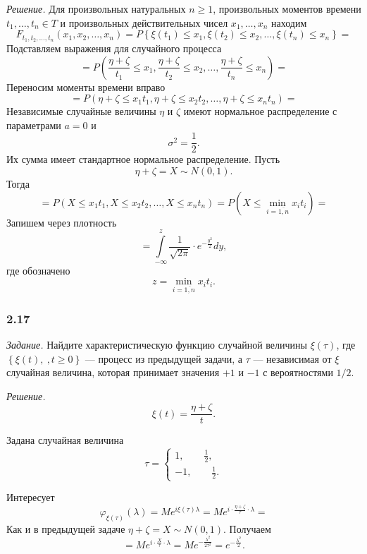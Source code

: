 \textit{Решение.}
Для произвольных натуральных $n \geq 1$,
произвольных моментов времени $t_1, \dotsc, t_n \in T$ и произвольных действительных чисел
$x_1, \dotsc, x_n$ находим
$$F_{t_1, t_2, \dotsc, t_n} \left( x_1, x_2, \dotsc, x_n \right) =
  P \left\{
    \xi \left( t_1 \right) \leq x_1, \xi \left( t_2 \right) \leq x_2, \dotsc,
    \xi \left( t_n \right) \leq x_n \right\} =$$
Подставляем выражения для случайного процесса
$$= P \left(
    \frac{ \eta + \zeta }{t_1} \leq x_1, \frac{ \eta + \zeta }{t_2} \leq x_2, \dotsc,
    \frac{ \eta + \zeta }{t_n} \leq x_n \right) =$$
Переносим моменты времени вправо
$$= P \left(
    \eta + \zeta \leq x_1 t_1, \eta + \zeta \leq x_2 t_2, \dotsc, \eta + \zeta \leq x_n t_n
  \right) =$$
Независимые случайные величины $ \eta $ и $ \zeta $ имеют нормальное распределение с параметрами
$a = 0$ и
$$ \sigma^2 =
  \frac{1}{2}.$$
Их сумма имеет стандартное нормальное распределение.
Пусть
$$ \eta + \zeta =
  X \sim
  N \left( 0, 1 \right).$$
Тогда
$$= P \left( X \leq x_1 t_1, X \leq x_2 t_2, \dotsc, X \leq x_n t_n \right) =
  P \left( X \leq \min \limits_{i = \overline{1, n}} x_i t_i \right) =$$
Запишем через плотность
$$= \int \limits_{- \infty }^z \frac{1}{ \sqrt{2 \pi }} \cdot e^{- \frac{y^2}{2}} dy,$$
где обозначено
$$z =
  \min \limits_{i = \overline{1, n}} x_i t_i.$$

\subsubsection*{2.17}

\textit{Задание.}
Найдите характеристическую функцию случайной величины $ \xi \left( \tau \right) $,
где $ \left\{ \xi \left( t \right),\ , t \geq 0 \right\} $ --- процесс из предыдущей задачи,
а $ \tau $ --- независимая от $ \xi $ случайная величина,
которая принимает значения $+1$ и $-1$ с вероятностями $1 / 2$.

\textit{Решение.}
$$ \xi \left( t \right) =
  \frac{ \eta + \zeta }{t}.$$

Задана случайная величина
$$ \tau =
  \begin{cases}
    1, \qquad \frac{1}{2}, \\
    -1, \qquad \frac{1}{2}.
  \end{cases}$$

Интересует
$$ \varphi_{ \xi \left( \tau \right) } \left( \lambda \right) =
  Me^{i \xi \left( \tau \right) \lambda } =
  Me^{i \cdot \frac{ \eta + \zeta }{ \tau } \cdot \lambda } =$$
Как и в предыдущей задаче $ \eta + \zeta = X \sim N \left( 0, 1 \right) $.
Получаем
$$= Me^{i \cdot \frac{X}{ \tau } \cdot \lambda } =
  Me^{-\frac{ \lambda ^2}{2 \tau^2}} =
  e^{- \frac{ \lambda^2}{2}}.$$

